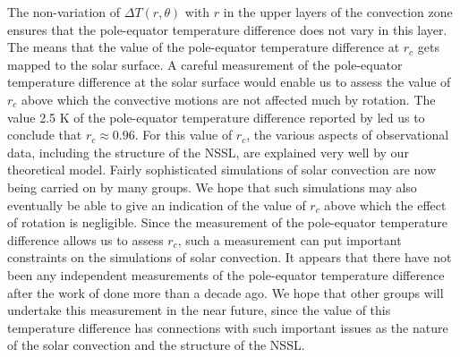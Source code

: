 The non-variation of $\Delta T (r, \theta)$ with $r$ in the upper layers of the convection zone ensures that the pole-equator temperature difference does not vary in this layer.  The means that the value of the pole-equator temperature difference at $r_c$ gets mapped to the solar surface.  A careful measurement of the pole-equator temperature difference at the solar surface would enable us to assess the value of $r_c$ above which the convective motions are not affected much by rotation.  The value 2.5 K of the pole-equator temperature difference reported by \citet{Rast2008} led us to conclude that $r_c \approx 0.96$\Rsun.  For this value of $r_c$, the various aspects of observational data, including the structure of the NSSL, are explained very well by our theoretical model. Fairly sophisticated simulations of solar convection are now being carried on by many groups. We hope that such
simulations may also eventually be able to give an indication of the value of $r_c$ above which the effect of rotation is negligible.  
Since the measurement of the pole-equator temperature difference allows us to assess $r_c$, such a measurement can put important constraints on the simulations of solar convection. It appears that there have not been any independent measurements of the pole-equator temperature  difference after the work of \citet{Rast2008} done more than a decade ago.  We hope that other groups will undertake this measurement in the near future, since the value of this temperature difference has connections with such important issues as the nature of the solar convection and the structure of the NSSL.


